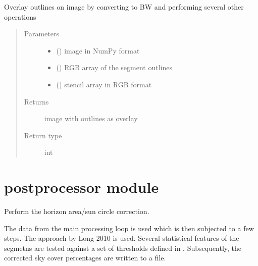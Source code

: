 \documentclass[letterpaper,10pt,english]{sphinxmanual}
\begin{document}
\begin{fulllineitems}
\label{\detokenize{overlay:overlay.outlines_over_image}}
Overlay outlines on image by converting to BW and performing several other operations
\begin{quote}\begin{description}
\item[{Parameters}] \leavevmode\begin{itemize}
\item {} 
 () \textendash{} image in NumPy format

\item {} 
 () \textendash{} RGB array of the segment outlines

\item {} 
 () \textendash{} stencil array in RGB format

\end{itemize}

\item[{Returns}] \leavevmode
image with outlines as overlay

\item[{Return type}] \leavevmode
int

\end{description}\end{quote}

\end{fulllineitems}



\section{postprocessor module}
\label{\detokenize{postprocessor:module-postprocessor}}\label{\detokenize{postprocessor::doc}}\label{\detokenize{postprocessor:postprocessor-module}}

\begin{fulllineitems}
\label{\detokenize{postprocessor:postprocessor.aerosol_correction}}
Perform the horizon area/sun circle correction.

The data from the main processing loop is used which is then subjected to a few steps. The approach by Long 2010
is used. Several statistical features of the segmetns are tested against a set of thresholds defined in
{\hyperref[\detokenize{settings:module-settings}]{}}. Subsequently, the corrected sky cover percentages are written to a file.

\end{fulllineitems}
\end{document}
